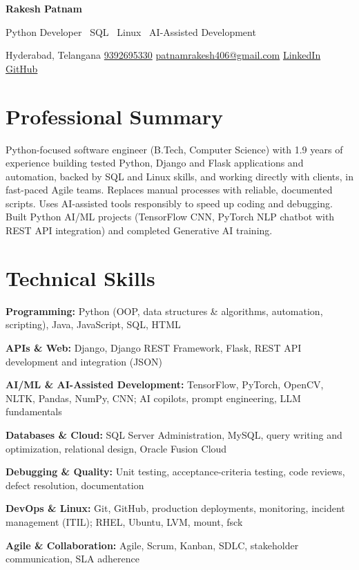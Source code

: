 \documentclass[a4paper,10pt]{article}
\begin{document}
\begin{center}
  {\fontsize{24}{28}\selectfont\bfseries Rakesh Patnam}\par
  \vspace{2pt}
  \small Python Developer \textbar\  SQL \textbar\  Linux \textbar\  AI-Assisted Development\par
  \vspace{2pt}
  Hyderabad, Telangana\enspace\textbar\enspace
  \href{tel:+919392695330}{9392695330}\enspace\textbar\enspace
  \href{mailto:patnamrakesh406@gmail.com}{patnamrakesh406@gmail.com}\enspace\textbar\enspace
  \href{https://www.linkedin.com/in/rakesh-patnam-}{LinkedIn}\enspace\textbar\enspace
  \href{https://github.com/Rakesh120205}{GitHub}
\end{center}

\section{Professional Summary}
Python-focused software engineer (B.Tech, Computer Science) with 1.9 years of experience building tested Python, Django and Flask applications and automation, backed by SQL and Linux skills, and working directly with clients, in fast-paced Agile teams. Replaces manual processes with reliable, documented scripts. Uses AI-assisted tools responsibly to speed up coding and debugging. Built Python AI/ML projects (TensorFlow CNN, PyTorch NLP chatbot with REST API integration) and completed Generative AI training.

\section{Technical Skills}
\textbf{Programming:} Python (OOP, data structures \& algorithms, automation, scripting), Java, JavaScript, SQL, HTML\par
\vspace{2pt}
\textbf{APIs \& Web:} Django, Django REST Framework, Flask, REST API development and integration (JSON)\par
\vspace{2pt}
\textbf{AI/ML \& AI-Assisted Development:} TensorFlow, PyTorch, OpenCV, NLTK, Pandas, NumPy, CNN; AI copilots, prompt engineering, LLM fundamentals\par
\vspace{2pt}
\textbf{Databases \& Cloud:} SQL Server Administration, MySQL, query writing and optimization, relational design, Oracle Fusion Cloud\par
\vspace{2pt}
\textbf{Debugging \& Quality:} Unit testing, acceptance-criteria testing, code reviews, defect resolution, documentation\par
\vspace{2pt}
\textbf{DevOps \& Linux:} Git, GitHub, production deployments, monitoring, incident management (ITIL); RHEL, Ubuntu, LVM, mount, fsck\par
\vspace{2pt}
\textbf{Agile \& Collaboration:} Agile, Scrum, Kanban, SDLC, stakeholder communication, SLA adherence\par
\end{document}

